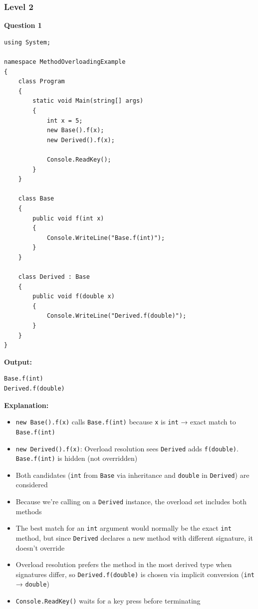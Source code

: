 \subsubsection{Level 2}

\textbf{Question 1}

\begin{lstlisting}[language=CSharp, caption={Method Overloading and Inheritance}]
using System;

namespace MethodOverloadingExample
{
    class Program
    {
        static void Main(string[] args)
        {
            int x = 5;
            new Base().f(x);
            new Derived().f(x);

            Console.ReadKey();
        }
    }

    class Base
    {
        public void f(int x)
        {
            Console.WriteLine("Base.f(int)");
        }
    }

    class Derived : Base
    {
        public void f(double x)
        {
            Console.WriteLine("Derived.f(double)");
        }
    }
}
\end{lstlisting}

\textbf{Output:}
\begin{verbatim}
Base.f(int)
Derived.f(double)
\end{verbatim}

\textbf{Explanation:}
\begin{itemize}
    \item \texttt{new Base().f(x)} calls \texttt{Base.f(int)} because \texttt{x} is \texttt{int} → exact match to \texttt{Base.f(int)}
    \item \texttt{new Derived().f(x)}: Overload resolution sees \texttt{Derived} adds \texttt{f(double)}. \texttt{Base.f(int)} is hidden (not overridden)
    \item Both candidates (\texttt{int} from \texttt{Base} via inheritance and \texttt{double} in \texttt{Derived}) are considered
    \item Because we're calling on a \texttt{Derived} instance, the overload set includes both methods
    \item The best match for an \texttt{int} argument would normally be the exact \texttt{int} method, but since \texttt{Derived} declares a new method with different signature, it doesn't override
    \item Overload resolution prefers the method in the most derived type when signatures differ, so \texttt{Derived.f(double)} is chosen via implicit conversion (\texttt{int} → \texttt{double})
    \item \texttt{Console.ReadKey()} waits for a key press before terminating
\end{itemize}

